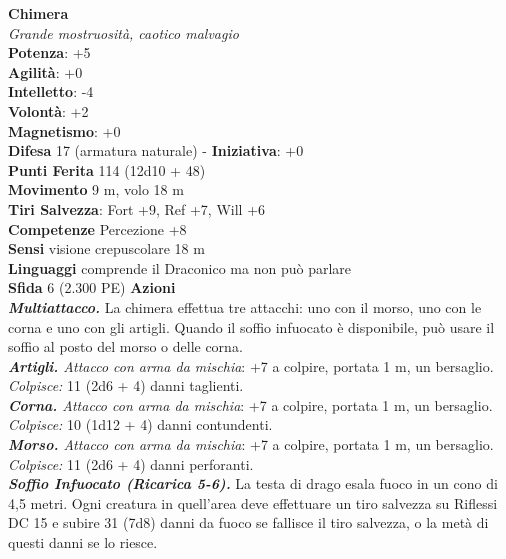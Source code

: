 \begin{multicols}{2}
\medskip\textbf{Chimera}\\
\emph{Grande mostruosità, caotico malvagio}\\
\textbf{Potenza}: +5\\
\textbf{Agilità}: +0\\
\textbf{Intelletto}: -4\\
\textbf{Volontà}: +2\\
\textbf{Magnetismo}: +0\\
\textbf{Difesa} 17 (armatura naturale) - \textbf{Iniziativa}: +0\\
\textbf{Punti Ferita} 114 (12d10 + 48)\\
\textbf{Movimento} 9 m, volo 18 m\\
\textbf{Tiri Salvezza}: Fort +9, Ref +7, Will +6\\
\textbf{Competenze} Percezione +8\\
\textbf{Sensi} visione crepuscolare 18 m\\
\textbf{Linguaggi} comprende il Draconico ma non può parlare\\
\textbf{Sfida} 6 (2.300 PE)\smallskip
\smallskip\textbf{Azioni}\\
\emph{\textbf{Multiattacco.}} La chimera effettua tre attacchi: uno con il morso, uno con le corna e uno con gli artigli. Quando il soffio infuocato è disponibile, può usare il soffio al posto del morso o delle corna.\\
\emph{\textbf{Artigli.} Attacco con arma da mischia}: +7 a colpire, portata 1 m, un bersaglio. \\
\emph{Colpisce:} 11 (2d6 + 4) danni taglienti.\\
\emph{\textbf{Corna.} Attacco con arma da mischia}: +7 a colpire, portata 1 m, un bersaglio.\\
\emph{Colpisce:} 10 (1d12 + 4) danni contundenti.\\
\emph{\textbf{Morso.} Attacco con arma da mischia}: +7 a colpire, portata 1 m, un bersaglio.\\
\emph{Colpisce:} 11 (2d6 + 4) danni perforanti.\\
\emph{\textbf{Soffio Infuocato (Ricarica 5-6).}} La testa di drago esala fuoco in un cono di 4,5 metri. Ogni creatura in quell'area deve effettuare un tiro salvezza su Riflessi DC 15 e subire 31 (7d8) danni da fuoco se fallisce il tiro salvezza, o la metà di questi danni se lo riesce.


\end{multicols}
